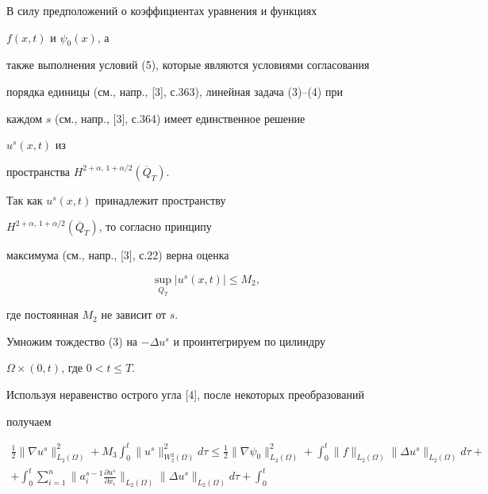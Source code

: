 \begin{pf}


В силу предположений о коэффициентах уравнения и функциях


$f(x,t)$ и $\psi_0(x)$, а


также выполнения условий (5), которые являются условиями согласования


порядка единицы (см., напр., [3], с.363), линейная задача (3)--(4) при


каждом $s$ (см., напр., [3], с.364) имеет единственное решение


$u^s(x,t)$ из


пространства $H^{2+\alpha,\,1+\alpha/2}(\overline Q_T)$.





Так как $u^s(x,t)$ принадлежит пространству


$H^{2+\alpha,\,1+\alpha/2}(\overline Q_T)$, то согласно принципу


максимума (см., напр., [3], с.22) верна оценка


\begin{equation}


\sup_{Q_T}|u^s(x,t)|\le M_2,


\end{equation}


где постоянная $M_2$ не зависит от $s$.





Умножим тождество (3) на $-\Delta u^s$ и проинтегрируем по цилиндру


$\Omega\times (0,t)$, где $0<t\le T$.


Используя неравенство острого угла [4], после некоторых преобразований


получаем


\begin{multline*}


\frac{1}{2}\|\nabla u^s\|^2_{L_2(\Omega)}+M_3


\int^t_0\|u^s\|^2_{W^2_2(\Omega)}d\tau\le \frac{1}{2}


\|\nabla\psi_0\|^2_{L_2(\Omega)}+\int^t_0


\|f\|_{L_2(\Omega)}\|\Delta u^s\|_{L_2(\Omega)}d\tau+\\


+\int^t_0 \sum^n_{i=1}\biggl\|a^{s-1}_i


\frac{\partial u^s}{\partial x_i}\biggr\|_{L_2(\Omega)}


\|\Delta u^s\|_{L_2(\Omega)}d\tau +\int^t_0



\end{multline*}
\end{pf}
